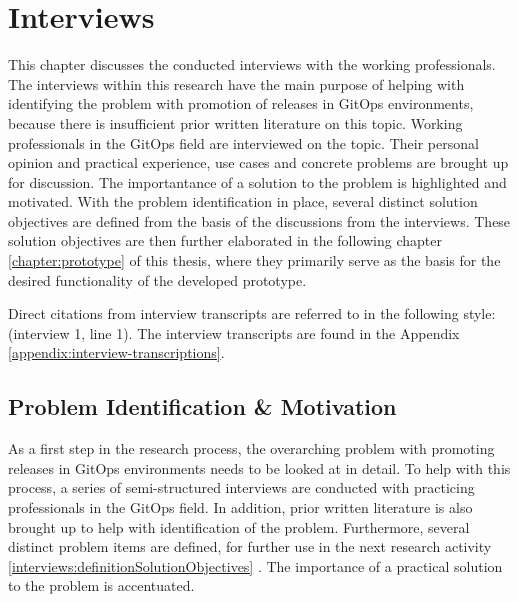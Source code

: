 

\chapter{Interviews}
\label{interviews}

This chapter discusses the conducted interviews with the working professionals.
The interviews within this research have the main purpose of helping with
identifying the problem with promotion of releases in GitOps environments,
because there is insufficient prior written literature on this topic.
Working professionals in the GitOps field are interviewed on the topic.
Their personal opinion and practical experience, use cases and concrete problems
are brought up for discussion. The importantance of a solution to the
problem is highlighted and motivated.
With the problem identification in place, several distinct solution objectives
are defined from the basis of the discussions from the interviews.
These solution objectives are then further elaborated in the following chapter
\ref{chapter:prototype} 
of this thesis, where they primarily serve as the basis for the
desired functionality of the developed prototype.

Direct citations from interview transcripts are referred to in the following style:
(interview 1, line 1).
The interview transcripts are found in the Appendix \ref{appendix:interview-transcriptions}.

\section{Problem Identification \& Motivation}
\label{interviews:problem-identification}

As a first step in the research process,
the overarching problem with promoting releases in GitOps environments
needs to be looked at in detail.
To help with this process, a series of semi-structured interviews are conducted with
practicing professionals in the GitOps field. In addition, prior written literature
is also brought up to help with identification of the problem.
Furthermore, several distinct problem items are defined,
for further use in the next research activity
\ref{interviews:definitionSolutionObjectives} .
The importance of a practical solution to the problem is accentuated.

